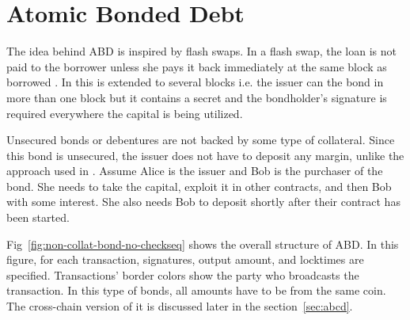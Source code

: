 \section{Atomic Bonded Debt}
\label{sec:abd}

The idea behind ABD is inspired by flash swaps. In a flash swap, the loan is not paid to the borrower unless she pays it back immediately at the same block as borrowed . In \abcd this is extended to several blocks i.e. the issuer can  the bond in more than one block but it contains a secret and the bondholder's signature is required everywhere the capital is being utilized. 

Unsecured bonds or debentures are not backed by some type of collateral. Since this bond is unsecured, the issuer does not have to deposit any margin, unlike the approach used in . Assume Alice is the issuer and Bob is the purchaser of the bond. She needs to take the capital, exploit it in other contracts, and then  Bob with some interest. She also needs Bob to deposit shortly after their contract has been started.

Fig~\ref{fig:non-collat-bond-no-checkseq} shows the overall structure of ABD. In this figure, for each transaction, signatures, output amount, and locktimes are specified. Transactions' border colors show the party who broadcasts the transaction. In this type of bonds, all amounts have to be from the same coin. The cross-chain version of it is discussed later in the section~\ref{sec:abcd}.

